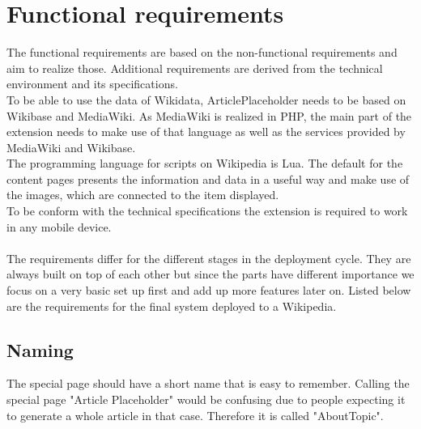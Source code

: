 
\section {Functional requirements}
The functional requirements are based on the non-functional requirements and aim to realize those. Additional requirements are derived from the technical environment and its specifications. \\
To be able to use the data of Wikidata, ArticlePlaceholder needs to be based on Wikibase and MediaWiki.
As MediaWiki is realized in PHP, the main part of the extension needs to make use of that language as well as the services provided by MediaWiki and Wikibase. \\
The programming language for scripts on Wikipedia is Lua. %
The default for the content pages presents the information and data in a useful way and make use of the images, which are connected to the item displayed.\\
To be conform with the technical specifications the extension is required to work in any mobile device. \\
\\
The requirements differ for the different stages in the deployment cycle. They are always built on top of each other but since the parts have different importance we focus on a very basic set up first and add up more features later on. Listed below are the requirements for the final system deployed to a Wikipedia.  \\

\subsection{Naming}
The special page should have a short name that is easy to remember. Calling the special page "Article Placeholder" would be confusing due to people expecting it to generate a whole article in that case. Therefore it is called "AboutTopic". %

